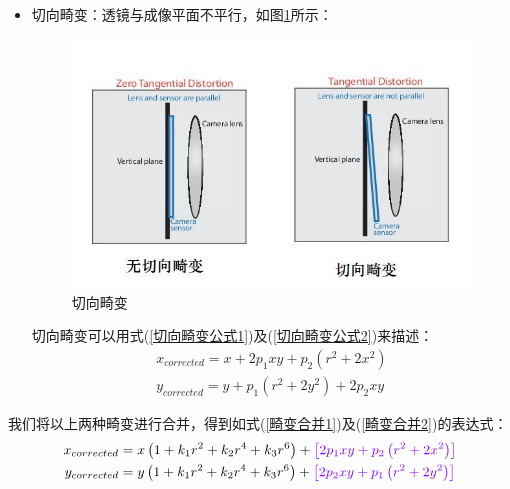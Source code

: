 \documentclass{article}
\begin{document}
\begin{itemize}
	\item 切向畸变：透镜与成像平面不平行，如图\ref{切向畸变}所示：
	\begin{figure}[H]
	\begin{center}
			\includegraphics[scale=0.35]{切向畸变.jpg}
			\caption{切向畸变}
			\label{切向畸变}
	\end{center}
	\end{figure}
	
切向畸变可以用式(\ref{切向畸变公式1})及(\ref{切向畸变公式2})来描述：
	\begin{gather}
		x_{corrected}=x+2p_1xy+p_2\left( r^2+2x^2 \right)  \label{切向畸变公式1}
	\\
		y_{corrected}=y+p_1\left( r^2+2y^2 \right) +2p_2xy \label{切向畸变公式2}
	\end{gather}
\end{itemize}

我们将以上两种畸变进行合并，得到如式(\ref{畸变合并1})及(\ref{畸变合并2})的表达式：
	\begin{gather}
	x_{corrected}=x\left( 1+k_1r^2+k_2r^4+k_3r^6 \right) +{\color[RGB]{128, 0, 255} \left[ 2p_1xy+p_2\left( r^2+2x^2 \right) \right] } \label{畸变合并1}
	\\
	y_{corrected}=y\left( 1+k_1r^2+k_2r^4+k_3r^6 \right) +{\color[RGB]{128, 0, 255} \left[ 2p_2xy+p_1\left( r^2+2y^2 \right) \right] }	\label{畸变合并2}
\end{gather}
\end{document}
